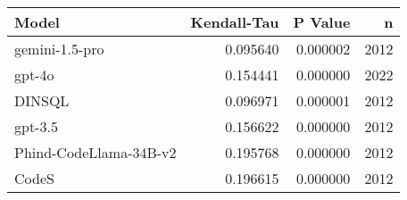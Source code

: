 \begin{tabular}{lrrr}
\toprule
Model & Kendall-Tau & P Value & n \\
\midrule
gemini-1.5-pro & 0.095640 & 0.000002 & 2012 \\
gpt-4o & 0.154441 & 0.000000 & 2022 \\
DINSQL & 0.096971 & 0.000001 & 2012 \\
gpt-3.5 & 0.156622 & 0.000000 & 2012 \\
Phind-CodeLlama-34B-v2 & 0.195768 & 0.000000 & 2012 \\
CodeS & 0.196615 & 0.000000 & 2012 \\
\bottomrule
\end{tabular}
